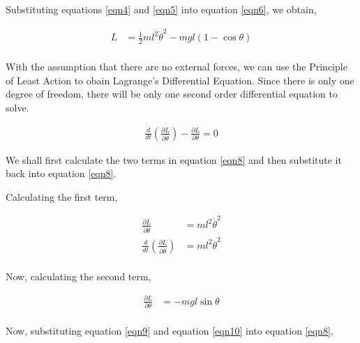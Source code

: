 \documentclass[12pt]{article}
\begin{document}
Substituting equations \ref{eqn4} and \ref{eqn5} into equation \ref{eqn6}, we obtain,

\begin{equation} \label{eqn7}
    \begin{split}
        L &= \frac{1}{2} m  l^{2} \dot{\theta}^{2} - mgl ( 1 - \cos{\theta} ) \\
    \end{split}
\end{equation}

With the assumption that there are no external forces, we can use the Principle of Least Action to
obain Lagrange's Differential Equation. Since there is only one degree of freedom, there will be only
one second order differential equation to solve.

\begin{equation} \label{eqn8}
    \begin{split}
        \frac{d}{dt} \left( \frac{\partial{L}}{\partial{\dot{\theta}}} \right) - \frac{\partial{L}}{\partial{\theta}} = 0                   
    \end{split}
\end{equation}

We shall first calculate the two terms in equation \ref{eqn8} and then substitute it back into equation \ref{eqn8}.

Calculating the first term,

\begin{equation} \label{eqn9}
    \begin{split}
        \frac{\partial{L}}{\partial{\dot{\theta}}} &= m l^{2} \dot{\theta}^{2} \\
        \frac{d}{dt} \left( \frac{\partial{L}}{\partial{\dot{\theta}}} \right) &= m l^{2} \ddot{\theta}^{2} \\
    \end{split}
\end{equation}

Now, calculating the second term,

\begin{equation} \label{eqn10}
    \begin{split}
        \frac{\partial{L}}{\partial{\theta}} &= -mgl\sin{\theta} \\
    \end{split}
\end{equation}

Now, substituting equation \ref{eqn9} and equation \ref{eqn10} into equation \ref{eqn8},
\end{document}
